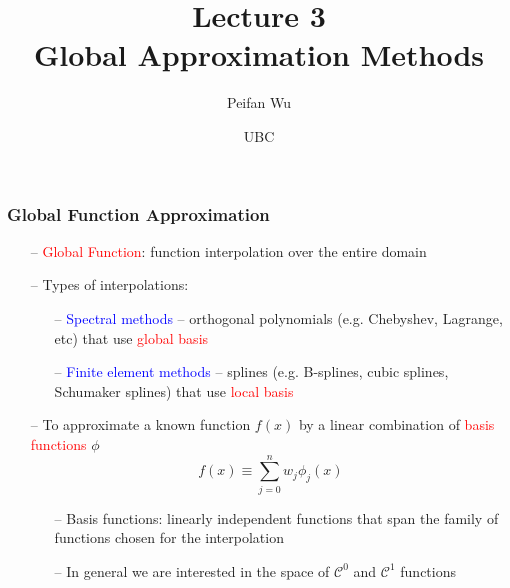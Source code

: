 \documentclass[aspectratio=169, 11pt]{beamer}
\begin{document}
\title{Lecture 3 \\ Global Approximation Methods}
\author[Wu]{Peifan Wu}
\date{UBC}

\begin{frame}
\titlepage
\end{frame}

\begin{frame}
\frametitle{Global Function Approximation}
  \begin{itemize}
    \item[--] \textcolor{red}{Global Function}: function interpolation over the entire domain
    \bigskip
    \item[--] Types of interpolations:
    \begin{itemize}
      \medskip
      \item[--] \textcolor{blue}{Spectral methods} -- orthogonal polynomials (e.g. Chebyshev, Lagrange, etc) that use \textcolor{red}{global basis}
      \medskip
      \item[--] \textcolor{blue}{Finite element methods} -- splines (e.g. B-splines, cubic splines, Schumaker splines) that use \textcolor{red}{local basis}
    \end{itemize}
    \bigskip
    \item[--] To approximate a known function $f\left(x\right)$ by a linear combination of \textcolor{red}{basis functions} $\phi$
    \[
      f\left(x\right)\equiv\sum_{j=0}^{n}w_{j}\phi_{j}\left(x\right)
    \]
    \begin{itemize}
      \item[--] Basis functions: linearly independent functions that span the family of functions chosen for the interpolation
      \medskip
      \item[--] In general we are interested in the space of $\mathcal{C}^{0}$ and $\mathcal{C}^{1}$ functions
    \end{itemize}
  \end{itemize}
\end{frame}
\end{document}
